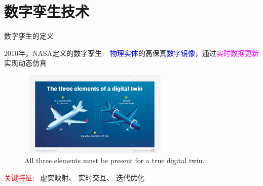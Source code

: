 \section{数字孪生技术}
\begin{frame}{数字孪生的定义}
	\begin{block}{\textrm{2010}年，\textrm{NASA}定义的数字孪生:~}
		\textcolor{blue}{物理实体}的高保真\textcolor{blue}{数字镜像}，通过\textcolor{magenta}{实时数据更新}实现动态仿真
  \end{block}
%

\begin{figure}[h!]
\centering
     \includegraphics[height=1.6in, width=2.9in, viewport=30 30 1100 680,clip]{Figures/Three-elements_of_a_digital-twin.png}
\caption{\tiny \textrm{All three elements must be present for a true digital twin.}}%
\label{Fig:Three-elements_of_a_digital-twin}
\end{figure}
\textcolor{red}{关键特征}:~
虚实映射、
实时交互、
迭代优化
\end{frame}

